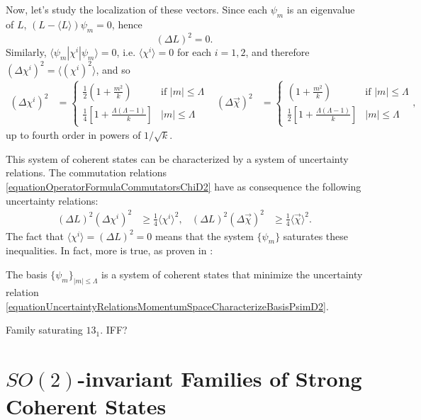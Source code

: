 Now, let's study the localization of these vectors. Since each $\psi_m$ is an eigenvalue of $L$, $(L - \langle L\rangle ) \psi_m = 0$, hence 
\begin{equation}
    (\Delta L)^2 = 0.
\end{equation}
Similarly, $\langle \psi_m | \chi^i | \psi_m \rangle = 0$, i.e. $\langle \chi^i \rangle = 0$ for each $i = 1, 2$, and therefore $(\Delta \chi^i)^2 = \langle (\chi^i)^2 \rangle$, and so
\begin{align}
    (\Delta \chi^i)^2 &= \begin{cases} \frac{1}{2} \left( 1 + \frac{m^2}{k} \right) & \text{if } |m| \leq \Lambda\\
    \frac{1}{4} \left[ 1 + \frac{\Lambda(\Lambda - 1)}{k} \right] & |m| \leq \Lambda \end{cases} &
    (\Delta \vec \chi)^2 &= \begin{cases} \left( 1 + \frac{m^2}{k} \right) & \text{if } |m| \leq \Lambda\\
    \frac{1}{2} \left[ 1 + \frac{\Lambda(\Lambda - 1)}{k} \right] & |m| \leq \Lambda \end{cases},
\end{align}
up to fourth order in powers of $1 / \sqrt{k}$.

This system of coherent states can be characterized by a system of uncertainty relations. The commutation relations \eqref{equationOperatorFormulaCommutatorsChiD2} have as consequence the following uncertainty relations:
\begin{align}\label{equationUncertaintyRelationsMomentumSpaceCharacterizeBasisPsimD2}
    (\Delta L)^2 (\Delta \chi^i)^2 &\geq \frac{1}{4}\langle \chi^i \rangle ^2,& (\Delta L)^2 (\Delta \vec \chi)^2 &\geq \frac{1}{4} \langle \vec \chi \rangle ^2.
\end{align}
The fact that $\langle \chi^i \rangle = (\Delta L)^2 = 0$ means that the system $\{\psi_m\}$ saturates these inequalities. In fact, more is true, as proven in \cite{FioreCoherent2020}:

\begin{proposition}
The basis $\{\psi_m\}_{|m|\leq \Lambda}$ is a system of coherent states that minimize the uncertainty relation \eqref{equationUncertaintyRelationsMomentumSpaceCharacterizeBasisPsimD2}.
\end{proposition}


Family saturating $13_1$. IFF?\todo{}

\section{$SO(2)$-invariant Families of Strong Coherent States}

